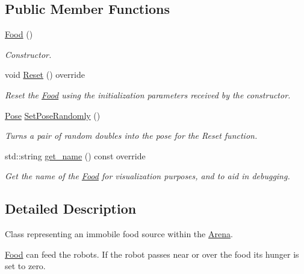 \subsection*{Public Member Functions}
\begin{DoxyCompactItemize}
\item 
\hyperlink{classFood_a75d4d7f76fd495cc8133302ca9fdc485}{Food} ()
\begin{DoxyCompactList}\small\item\em Constructor. \end{DoxyCompactList}\item 
void \hyperlink{classFood_a1a12bfd50400e04b595c24a512317c1a}{Reset} () override\hypertarget{classFood_a1a12bfd50400e04b595c24a512317c1a}{}\label{classFood_a1a12bfd50400e04b595c24a512317c1a}

\begin{DoxyCompactList}\small\item\em Reset the \hyperlink{classFood}{Food} using the initialization parameters received by the constructor. \end{DoxyCompactList}\item 
\hyperlink{structPose}{Pose} \hyperlink{classFood_a33e1fe7add16d51bdb67d9a43779c8c3}{Set\+Pose\+Randomly} ()\hypertarget{classFood_a33e1fe7add16d51bdb67d9a43779c8c3}{}\label{classFood_a33e1fe7add16d51bdb67d9a43779c8c3}

\begin{DoxyCompactList}\small\item\em Turns a pair of random doubles into the pose for the Reset function. \end{DoxyCompactList}\item 
std\+::string \hyperlink{classFood_a5c3bcd5109750a15ebb24b8a2a3cdd07}{get\+\_\+name} () const override
\begin{DoxyCompactList}\small\item\em Get the name of the \hyperlink{classFood}{Food} for visualization purposes, and to aid in debugging. \end{DoxyCompactList}\end{DoxyCompactItemize}


\subsection{Detailed Description}
Class representing an immobile food source within the \hyperlink{classArena}{Arena}. 

\hyperlink{classFood}{Food} can feed the robots. If the robot passes near or over the food its hunger is set to zero.

